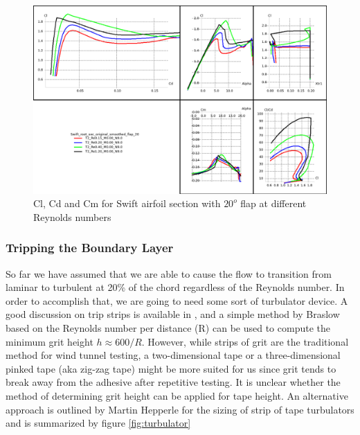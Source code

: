 \documentclass[titlepage,10pt]{article}
\begin{document}
\begin{landscape}
	\begin{figure}
	\begin{center}
	\includegraphics[width=220mm]{xfoil_T2_analysis_flap20.png}
	\end{center}
	\caption{Cl, Cd and Cm for Swift airfoil section with $20^o$ flap at different Reynolds numbers}
	\label{fig:xfoilflap}
	\end{figure}
\end{landscape}



\subsubsection{Tripping the Boundary Layer}
So far we have assumed that we are able to cause the flow to transition from laminar to turbulent at 20\% of the chord regardless of the Reynolds number. In order to accomplish that, we are going to need some sort of turbulator device. A good discussion on trip strips is available in \cite{WindTunnel}, and a simple method by Braslow \cite{Gritheight} based on the Reynolds number per distance (R) can be used to compute the minimum grit height $h \approx 600/R$. However, while strips of grit are the traditional method for wind tunnel testing, a two-dimensional tape or a three-dimensional pinked tape (aka zig-zag tape) might be more suited for us since grit tends to break away from the adhesive after repetitive testing. It is unclear whether the method of determining grit height can be applied for tape height. An alternative approach is outlined by Martin Hepperle \cite{Hepperle} for the sizing of strip of tape turbulators and is summarized by figure \ref{fig:turbulator}
\end{document}
